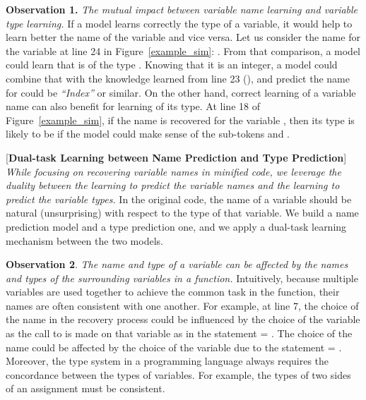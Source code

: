 \vspace{2pt} \textbf{Observation 1.} {\em The mutual impact between
  variable name learning and variable type learning.} If a model
learns correctly the type of a variable, it would help to learn better
the name of the variable and vice versa. Let us consider the name
 for the variable  at line 24 in
Figure~\ref{example_sim}: . From that comparison, a
model could learn that  is of the type . Knowing
that it is an integer, a model could combine that with the knowledge
learned from line 23 (), and predict the
name for  could be {\em ``Index''} or similar. On
the other hand, correct learning of a variable name can also benefit
for learning of its type. At line 18 of Figure~\ref{example_sim}, if
the name  is recovered for the variable
, then its type is likely to be  if the model could
make sense of the sub-tokens  and .

\vspace{2pt}  [{\bf Dual-task Learning
    between Name Prediction and Type Prediction}] {\em While focusing
  on recovering variable names in minified code, we leverage the
  duality between the learning to predict the variable names and the
  learning to predict the variable types.} In the original code, the
name of a variable should be natural (unsurprising) with respect to
the type of that variable. We build a name prediction model and a type
prediction one, and we apply a dual-task learning mechanism between
the two models.

\vspace{2pt}
\textbf{Observation 2}. {\em The name and type of a variable can be
  affected by the names and types of the surrounding variables in a
  function.}  Intuitively, because multiple variables are used
together to achieve the common task in the function, their names are
often consistent with one another. For example, at line 7, the choice
of the name  in the recovery process could be influenced
by the choice of the variable  as the call to
 is made on that variable as in the statement
 = . The choice of the name
 could be affected by the choice of the
variable  due to the statement  =
. Moreover, the type system in a programming
language always requires the concordance between the types of
variables. For example, the types of two sides of an assignment must
be consistent.

